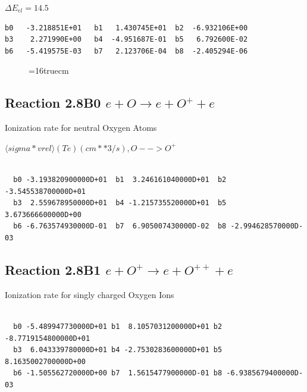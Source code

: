 \documentclass[12pt,dvipdfmx]{article}
\begin{document}
$\Delta E_{el} = 14.5$
\begin{small}\begin{verbatim}
b0   -3.218851E+01   b1   1.430745E+01  b2  -6.932106E+00
b3    2.271990E+00   b4  -4.951687E-01  b5   6.792600E-02
b6   -5.419575E-03   b7   2.123706E-04  b8  -2.405294E-06
\end{verbatim}\end{small}


\begin{figure} \label{2.7Br}
\epsfxsize=16truecm
\end{figure}
\newpage

\subsection{
Reaction 2.8B0   $e + O \rightarrow e + O^+ + e  $
}

  Ionization rate for neutral Oxygen Atoms

  $ \langle sigma*vrel \rangle(Te)  (cm**3/s), O --> O^+$

\begin{small}\begin{verbatim}

  b0 -3.193820900000D+01  b1  3.246161040000D+01  b2 -3.545538700000D+01
  b3  2.559678950000D+01  b4 -1.215735520000D+01  b5  3.673666600000D+00
  b6 -6.763574930000D-01  b7  6.905007430000D-02  b8 -2.994628570000D-03

\end{verbatim}\end{small}

\subsection{
Reaction 2.8B1   $e + O^+ \rightarrow e + O^{++} + e  $
}

  Ionization rate for singly charged Oxygen Ions


\begin{small}\begin{verbatim}

  b0 -5.489947730000D+01 b1  8.1057031200000D+01 b2 -8.7719154800000D+01
  b3  6.043339780000D+01 b4 -2.7530283600000D+01 b5  8.1635002700000D+00
  b6 -1.505562720000D+00 b7  1.5615477900000D-01 b8 -6.9385679400000D-03

\end{verbatim}\end{small}
\end{document}
